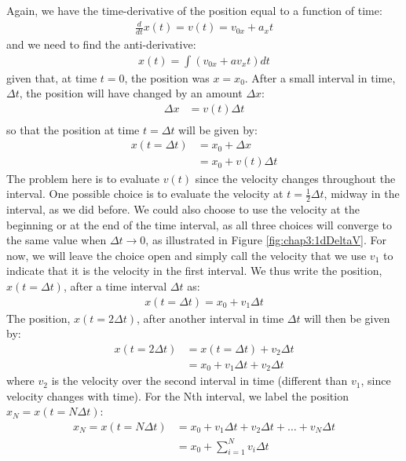 Again, we have the time-derivative of the position equal to a function of time:
\begin{align*}
\frac{d}{dt}x(t)=v(t)=v_{0x}+a_xt
\end{align*}
and we need to find the anti-derivative:
\begin{align*}
x(t) = \int \left(  v_{0x}+av_xt \right) dt 
\end{align*}
given that, at time $t=0$, the position was $x=x_0$. After a small interval in time, $\Delta t$, the position will have changed by an amount $\Delta x$:
\begin{align*}
\Delta x &= v(t) \Delta t\\
\end{align*}
so that the position at time $t=\Delta t$ will be given by:
\begin{align*}
x(t=\Delta t) &= x_0+ \Delta x\\
& = x_0+v(t) \Delta t
\end{align*}
The problem here is to evaluate $v(t)$ since the velocity changes throughout the interval. One possible choice is to evaluate the velocity at $t = \frac{1}{2}\Delta t$, midway in the interval, as we did before. We could also choose to use the velocity at the beginning or at the end of the time interval, as all three choices will converge to the same value when $\Delta t \to 0$, as illustrated in Figure \ref{fig:chap3:1dDeltaV}. For now, we will leave the choice open and simply call the velocity that we use $v_1$ to indicate that it is the velocity in the first interval. We thus write the position, $x(t=\Delta t)$, after a time interval $\Delta t$ as:
\begin{align*}
x(t=\Delta t) = x_0+v_1\Delta t
\end{align*}
The position, $x(t=2\Delta t)$, after another interval in time $\Delta t$ will then be given by:
\begin{align*}
x(t=2\Delta t) &= x(t=\Delta t)+v_2\Delta t\\
&=x_0+v_1\Delta t+v_2\Delta t
\end{align*}
where $v_2$ is the velocity over the second interval in time (different than $v_1$, since velocity changes with time). For the Nth interval, we label the position $x_N=x(t=N\Delta t)$:
\begin{align*}
x_N=x(t=N\Delta t)&=x_0+v_1\Delta t+v_2\Delta t+\dots+v_N\Delta t\\
&=x_0+\sum_{i=1}^Nv_i\Delta t 
\end{align*}

